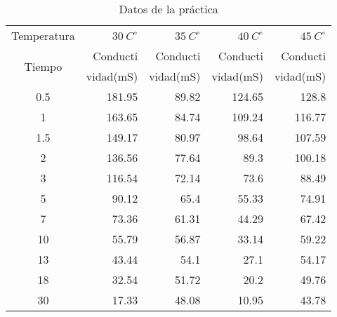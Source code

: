\begin{table}[H]
  \centering
  \caption{Datos de la práctica}
    \begin{tabular}{crrrr}
    \hline
    \multicolumn{1}{l}{Temperatura} & $30 \: C^{ \circ}$    & $35\: C^{ \circ}$    & $40\: C^{ \circ}$    & $45\: C^{ \circ}$ \\
    \multicolumn{1}{c}{\multirow{2}[0]{*}{Tiempo}} & \multicolumn{1}{p{4.335em}}{Conducti} & \multicolumn{1}{p{4.445em}}{Conducti} & \multicolumn{1}{p{4.28em}}{Conducti} & \multicolumn{1}{p{3.945em}}{Conducti} \\
          & \multicolumn{1}{p{4.335em}}{vidad(mS)} & \multicolumn{1}{p{4.445em}}{vidad(mS)} & \multicolumn{1}{p{4.28em}}{vidad(mS)} & \multicolumn{1}{p{3.945em}}{vidad(mS)} \\ \hline
    0.5   & 181.95 & 89.82 & 124.65 & 128.8 \\
    1     & 163.65 & 84.74 & 109.24 & 116.77 \\
    1.5   & 149.17 & 80.97 & 98.64 & 107.59 \\
    2     & 136.56 & 77.64 & 89.3  & 100.18 \\
    3     & 116.54 & 72.14 & 73.6  & 88.49 \\
    5     & 90.12 & 65.4  & 55.33 & 74.91 \\
    7     & 73.36 & 61.31 & 44.29 & 67.42 \\
    10    & 55.79 & 56.87 & 33.14 & 59.22 \\
    13    & 43.44 & 54.1  & 27.1  & 54.17 \\
    18    & 32.54 & 51.72 & 20.2  & 49.76 \\
    30    & 17.33 & 48.08 & 10.95 & 43.78 \\ \hline
    \end{tabular}%
  \label{tab:addlabel}%
\end{table}%
  